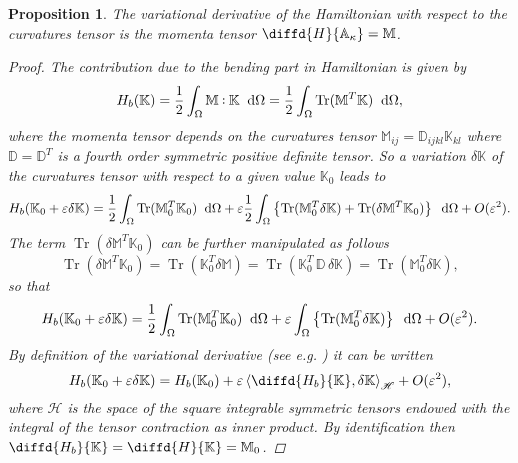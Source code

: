 \documentclass[preprint,12pt]{elsarticle}
\DeclareMathOperator{\Tr}{Tr}
\newtheorem{proposition}{Proposition}
\def\onedot{$\mathsurround0pt\ldotp$}
\def\cddot{%
	\mathbin{\vcenter{\baselineskip.67ex
			\hbox{\onedot}\hbox{\onedot}}%
}}
\begin{document}
\begin{proposition}
	The variational derivative of the Hamiltonian with respect to the curvatures tensor is the momenta tensor $\diffd{H}{\mathbb{A}_{\kappa}} = \mathbb{M}$.
	\begin{proof}
		The contribution due to the bending part in Hamiltonian is given by 
		\[H_b(\mathbb{K}) = \frac{1}{2} \int_{\Omega}  \mathbb{M} \cddot \mathbb{K} \; \d\Omega = \frac{1}{2} \int_{\Omega} \Tr(\mathbb{M}^T \mathbb{K}) \; \d\Omega, \]
		where the momenta tensor depends on the curvatures tensor $\mathbb{M}_{ij} = \mathbb{D}_{ijkl}\mathbb{K}_{kl} $ where $\mathbb{D} = \mathbb{D}^T$ is a fourth order symmetric positive definite tensor.
		So a variation $\delta\mathbb{K}$ of the curvatures tensor with respect to a given value $\mathbb{K}_0$ leads to
		\[H_b(\mathbb{K}_0+ \varepsilon \delta\mathbb{K}) = \frac{1}{2} \int_{\Omega} \Tr(\mathbb{M}_0^T \mathbb{K}_0) \; \d\Omega + \varepsilon \frac{1}{2} \int_{\Omega} \left\{ \Tr(\mathbb{M}_0^T \delta\mathbb{K}) + \Tr(\delta\mathbb{M}^T \mathbb{K}_0)\right\}\; \d\Omega  + O(\varepsilon^2). \]
		The term $\Tr(\delta\mathbb{M}^T \mathbb{K}_0)$ can be further manipulated as follows 
		\[ \Tr(\delta\mathbb{M}^T \mathbb{K}_0) = \Tr(\mathbb{K}_0^T \delta\mathbb{M}) = \Tr(\mathbb{K}_0^T \, \mathbb{D} \, \delta\mathbb{K}) = \Tr(\mathbb{M}_0^T \delta\mathbb{K}),
		\]
		 so that 
		\[H_b(\mathbb{K}_0+ \varepsilon \delta\mathbb{K}) = \frac{1}{2} \int_{\Omega} \Tr(\mathbb{M}_0^T \mathbb{K}_0) \; \d\Omega + \varepsilon \int_{\Omega} \left\{ \Tr(\mathbb{M}_0^T \delta\mathbb{K})\right\}\; \d\Omega  + O(\varepsilon^2). \]
		By definition of the variational derivative (see e.g. \cite{VANDERSCHAFT2002166}) it can be written
		\[H_b(\mathbb{K}_0+ \varepsilon \delta\mathbb{K}) = H_b(\mathbb{K}_0) + \varepsilon \left\langle \diffd{H_b}{\mathbb{K}} , \delta\mathbb{K}  \right\rangle_{\mathscr{H}} + O(\varepsilon^2), \]
		where $\mathscr{H}$ is the space of the square integrable symmetric tensors endowed with the integral of the tensor contraction as inner product. By identification then $\diffd{H_b}{\mathbb{K}} = \diffd{H}{\mathbb{K}} = \mathbb{M}_0$.
	\end{proof}
\end{proposition}
\end{document}
